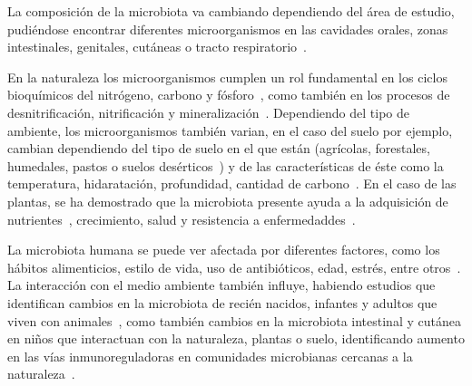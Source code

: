 La composición de la microbiota va cambiando dependiendo del área de estudio, pudiéndose encontrar diferentes microorganismos en las cavidades orales, zonas intestinales, genitales, cutáneas o tracto respiratorio~\cite{ursell2012interpersonal}.


En la naturaleza los microorganismos cumplen un rol fundamental en los ciclos bioquímicos del nitrógeno, carbono y fósforo~\cite{bitton1994role, gougoulias2014role}, como también en los procesos de desnitrificación, nitrificación y mineralización~\cite{bitton1994role, gougoulias2014role}. 
Dependiendo del tipo de ambiente, los microorganismos también varian, en el caso del suelo por ejemplo, cambian dependiendo del tipo de suelo en el que están (agrícolas, forestales, humedales, pastos o suelos desérticos~\cite{jiao2021linking}) y de las características de éste como la temperatura, hidaratación, profundidad, cantidad de carbono~\cite{bickel2020soil}.
En el caso de las plantas, se ha demostrado que la microbiota presente ayuda a la adquisición de nutrientes~\cite{hu2017probiotic}, crecimiento, salud y resistencia a enfermedaddes~\cite{lemanceau2017let,hardoim2015hidden,vorholt2012microbial,COMPANT201929}.


La microbiota humana se puede ver afectada por diferentes factores, como los hábitos alimenticios, estilo de vida, uso de antibióticos, edad, estrés, entre otros~\cite{altvecs2020interaction}. 
La interacción con el medio ambiente también influye, habiendo estudios que identifican cambios en la microbiota de recién nacidos, infantes y adultos que viven con animales~\cite{tun2017exposure, azad2013infant,kates2020household}, como también cambios en la microbiota intestinal y cutánea en niños que interactuan con la naturaleza, plantas o suelo, identificando aumento en las vías inmunoreguladoras en comunidades microbianas cercanas a la naturaleza~\cite{roslund2020biodiversity}.




